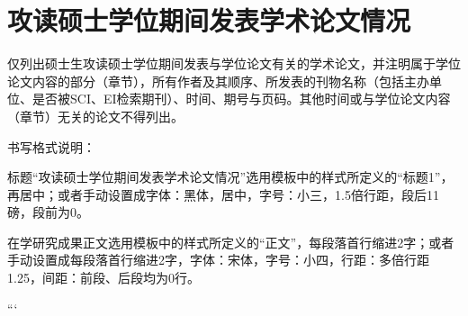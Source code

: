 \chapter*{攻读硕士学位期间发表学术论文情况}

仅列出硕士生攻读硕士学位期间发表与学位论文有关的学术论文，并注明属于学位论文内容的部分（章节），所有作者及其顺序、所发表的刊物名称（包括主办单位、是否被SCI、EI检索期刊）、时间、期号与页码。其他时间或与学位论文内容（章节）无关的论文不得列出。

书写格式说明：

标题“攻读硕士学位期间发表学术论文情况”选用模板中的样式所定义的“标题1”，再居中；或者手动设置成字体：黑体，居中，字号：小三，1.5倍行距，段后11磅，段前为0。

在学研究成果正文选用模板中的样式所定义的“正文”，每段落首行缩进2字；或者手动设置成每段落首行缩进2字，字体：宋体，字号：小四，行距：多倍行距 1.25，间距：前段、后段均为0行。

```